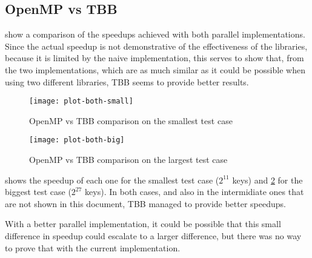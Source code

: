 \subsection{OpenMP vs TBB}
\label{sec:810}

 show a comparison of the speedups achieved with both parallel implementations. Since the actual speedup is not demonstrative of the effectiveness of the libraries, because it is limited by the naive implementation, this serves to show that, from the two implementations, which are as much similar as it could be possible when using two different libraries, TBB seems to provide better results.

\begin{figure}[!htp]
	\centering
	\texttt{[image: plot-both-small]}
	\caption{OpenMP vs TBB comparison on the smallest test case}
	\label{fig:both-small}
\end{figure}

\begin{figure}[!htp]
	\centering
	\texttt{[image: plot-both-big]}
	\caption{OpenMP vs TBB comparison on the largest test case}
	\label{fig:both-big}
\end{figure}

 shows the speedup of each one for the smallest test case ($2^{11}$ keys) and \cref{fig:both-big} for the biggest test case ($2^{27}$ keys). In both cases, and also in the intermidiate ones that are not shown in this document, TBB managed to provide better speedups.

With a better parallel implementation, it could be possible that this small difference in speedup could escalate to a larger difference, but there was no way to prove that with the current implementation.